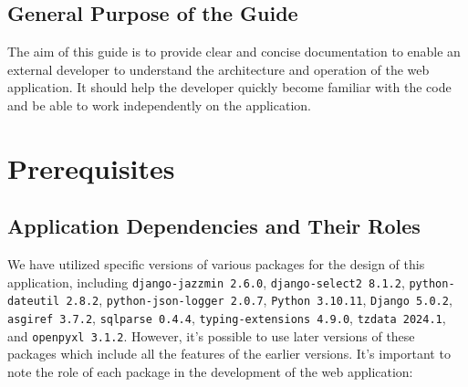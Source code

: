 \documentclass[12pt]{article}
\begin{document}
\subsection{General Purpose of the Guide}
The aim of this guide is to provide clear and concise documentation to enable an external developer to understand the architecture and operation of the web application. It should help the developer quickly become familiar with the code and be able to work independently on the application.



\newpage

\section{Prerequisites}

\subsection{Application Dependencies and Their Roles}

We have utilized specific versions of various packages for the design of this application, including \texttt{django-jazzmin 2.6.0}, \texttt{django-select2 8.1.2}, \texttt{python-dateutil 2.8.2}, \texttt{python-json-logger 2.0.7}, \texttt{Python 3.10.11}, \texttt{Django 5.0.2}, \texttt{asgiref 3.7.2}, \texttt{sqlparse 0.4.4}, \texttt{typing-extensions 4.9.0}, \texttt{tzdata 2024.1}, and \texttt{openpyxl 3.1.2}. However, it's possible to use later versions of these packages which include all the features of the earlier versions. It's important to note the role of each package in the development of the web application:
\end{document}

